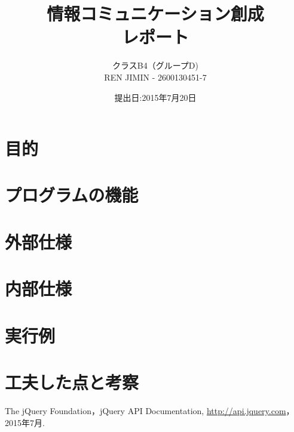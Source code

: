 \documentclass{jarticle}
\title{情報コミュニケーション創成\\レポート}
\author{クラスB4（グループD)\\REN JIMIN - 2600130451-7}
\date{提出日:2015年7月20日}
\begin{document}
\maketitle
\tableofcontents
\clearpage

\section{目的}
	
\section{プログラムの機能}
	
\section{外部仕様}
	
\section{内部仕様}
	
\section{実行例}
	
\section{工夫した点と考察}
		
	
\begin{thebibliography}{1}

 The jQuery Foundation，jQuery API Documentation,
	\url{http://api.jquery.com}，2015年7月.
\end{thebibliography}
\end{document}
